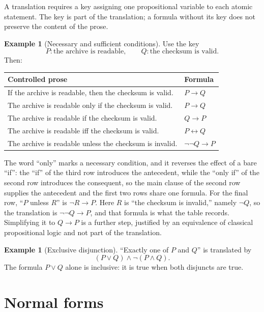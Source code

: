 \documentclass[11pt,oneside,openany]{book}
\theoremstyle{definition}
\newtheorem{example}[definition]{Example}
\theoremstyle{plain}
\theoremstyle{remark}
\begin{document}
A translation requires a key assigning one propositional variable to each
atomic statement.  The key is part of the translation; a formula without its
key does not preserve the content of the prose.

\begin{example}[Necessary and sufficient conditions]
Use the key
\[
  P:\text{the archive is readable},
  \qquad Q:\text{the checksum is valid}.
\]
Then:
\begin{center}
\begin{tabular}{@{}ll@{}}
\toprule
Controlled prose & Formula \\ \midrule
If the archive is readable, then the checksum is valid. & \(P\to Q\) \\
The archive is readable only if the checksum is valid. & \(P\to Q\) \\
The archive is readable if the checksum is valid. & \(Q\to P\) \\
The archive is readable iff the checksum is valid. & \(P\leftrightarrow Q\) \\
The archive is readable unless the checksum is invalid. & \(\neg\neg Q\to P\) \\
\bottomrule
\end{tabular}
\end{center}
The word ``only'' marks a necessary condition, and it reverses the effect
of a bare ``if'': the ``if'' of the third row introduces the antecedent,
while the ``only if'' of the second row introduces the consequent, so the
main clause of the second row supplies the antecedent and the first two
rows share one formula.
For the final row, ``\(P\) unless \(R\)'' is \(\neg R\to P\).  Here
\(R\) is ``the checksum is invalid,'' namely \(\neg Q\), so the translation
is \(\neg\neg Q\to P\), and that formula is what the table records.
Simplifying it to \(Q\to P\) is a further step, justified by an equivalence
of classical propositional logic and not part of the translation.
\end{example}

\begin{example}[Exclusive disjunction]
``Exactly one of \(P\) and \(Q\)'' is translated by
\[
  (P\lor Q)\land\neg(P\land Q).
\]
The formula \(P\lor Q\) alone is inclusive: it is true when both disjuncts are
true.
\end{example}

\section{Normal forms}
\label{sec:prop-syntax-semantics-04}
\end{document}

